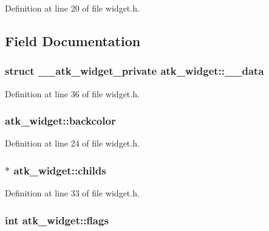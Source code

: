 Definition at line 20 of file widget.\+h.



\subsection{Field Documentation}
\hypertarget{structatk__widget_a2af132bf83c5a165c04ec1dd67e781e5}{
\subsubsection[{\+\_\+\+\_\+data}]{\setlength{\rightskip}{0pt plus 5cm}struct {\bf \+\_\+\+\_\+atk\+\_\+widget\+\_\+private} atk\+\_\+widget\+::\+\_\+\+\_\+data}}\label{structatk__widget_a2af132bf83c5a165c04ec1dd67e781e5}


Definition at line 36 of file widget.\+h.

\hypertarget{structatk__widget_a1ce3f914210cd44c532688e1b98e7ba7}{
\subsubsection[{backcolor}]{ atk\+\_\+widget\+::backcolor}}\label{structatk__widget_a1ce3f914210cd44c532688e1b98e7ba7}


Definition at line 24 of file widget.\+h.

\hypertarget{structatk__widget_a7309354f2c4bcf58373c2aebf599a2e1}{
\subsubsection[{childs}]{$\ast$ atk\+\_\+widget\+::childs}}\label{structatk__widget_a7309354f2c4bcf58373c2aebf599a2e1}


Definition at line 33 of file widget.\+h.

\hypertarget{structatk__widget_a5b936c20bb006d5a45855873bb96f4f5}{
\subsubsection[{flags}]{\setlength{\rightskip}{0pt plus 5cm}int atk\+\_\+widget\+::flags}}\label{structatk__widget_a5b936c20bb006d5a45855873bb96f4f5}


